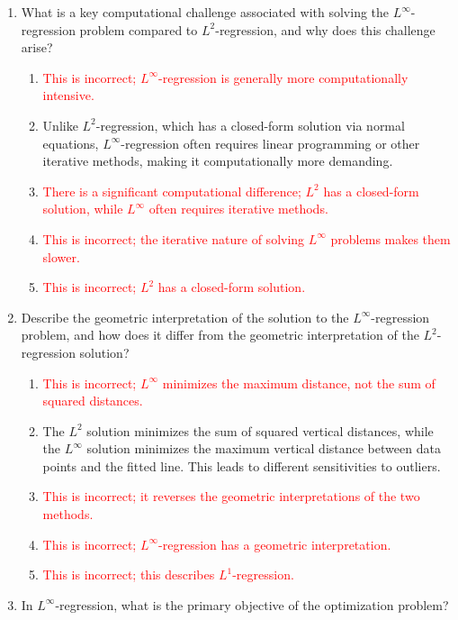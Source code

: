 \documentclass{article}%
\newcommand{\incorrect}[1]{\textcolor{red}{#1}}
\begin{document}
\begin{enumerate}
\begin{enumerate}
\end{enumerate}%
\vspace{1em}%
\item What is a key computational challenge associated with solving the $L^\infty$-regression problem compared to $L^2$-regression, and why does this challenge arise?%
\begin{enumerate}%
\item \incorrect{This is incorrect; $L^\infty$-regression is generally more computationally intensive.}%
\item Unlike $L^2$-regression, which has a closed-form solution via normal equations, $L^\infty$-regression often requires linear programming or other iterative methods, making it computationally more demanding.%
\item \incorrect{There is a significant computational difference; $L^2$ has a closed-form solution, while $L^\infty$ often requires iterative methods.}%
\item \incorrect{This is incorrect; the iterative nature of solving $L^\infty$ problems makes them slower.}%
\item \incorrect{This is incorrect; $L^2$ has a closed-form solution.}%
\end{enumerate}%
\vspace{1em}%
\item Describe the geometric interpretation of the solution to the $L^\infty$-regression problem, and how does it differ from the geometric interpretation of the $L^2$-regression solution?%
\begin{enumerate}%
\item \incorrect{This is incorrect; $L^\infty$ minimizes the maximum distance, not the sum of squared distances.}%
\item The $L^2$ solution minimizes the sum of squared vertical distances, while the $L^\infty$ solution minimizes the maximum vertical distance between data points and the fitted line.  This leads to different sensitivities to outliers.%
\item \incorrect{This is incorrect; it reverses the geometric interpretations of the two methods.}%
\item \incorrect{This is incorrect; $L^\infty$-regression has a geometric interpretation.}%
\item \incorrect{This is incorrect; this describes $L^1$-regression.}%
\end{enumerate}%
\vspace{1em}%
\item In $L^\infty$-regression, what is the primary objective of the optimization problem?%

\end{enumerate}
\end{document}
